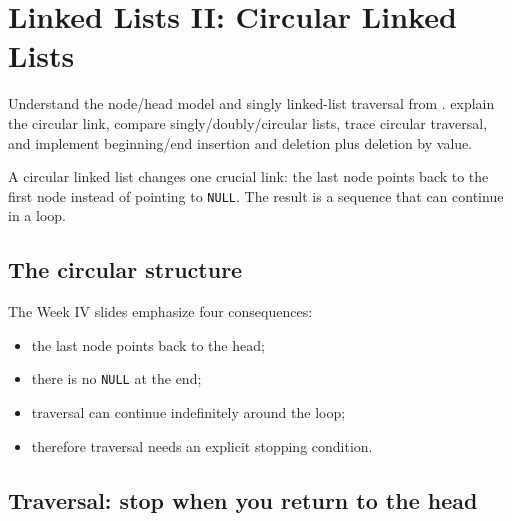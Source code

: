 \chapter{Linked Lists II: Circular Linked Lists}
\label{ch:circular-list}

\chapterguide%
  {Understand the node/head model and singly linked-list traversal from .}
  {explain the circular link, compare singly/doubly/circular lists, trace circular traversal, and implement beginning/end insertion and deletion plus deletion by value.}

A circular linked list changes one crucial link: the last node points back to the first node instead of pointing to \texttt{NULL}. The result is a sequence that can continue in a loop.

\section{The circular structure}

\begin{mlfigure}
\end{mlfigure}

The Week IV slides emphasize four consequences:

\begin{itemize}
  \item the last node points back to the head;
  \item there is no \texttt{NULL} at the end;
  \item traversal can continue indefinitely around the loop;
  \item therefore traversal needs an explicit stopping condition.
\end{itemize}

\section{Traversal: stop when you return to the head}

